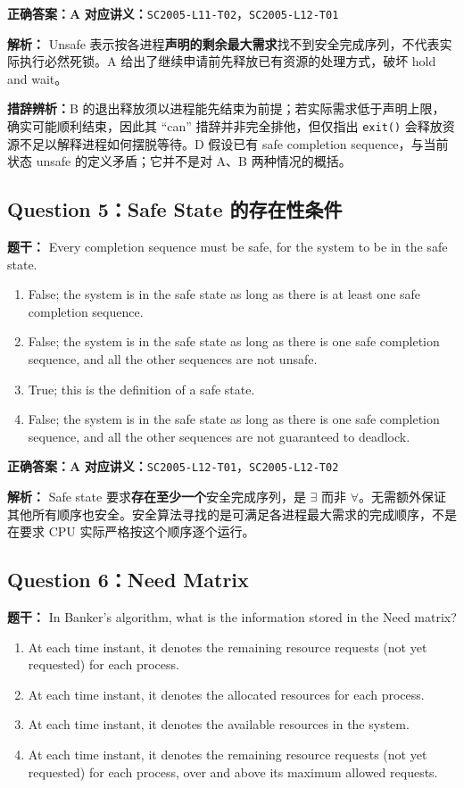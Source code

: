 \documentclass[11pt,a4paper,fontset=fandol]{ctexart}
\renewcommand{\exercisequestion}[2]{%
  \Needspace{5\baselineskip}%
  \subsection{#2}\label{exercise:#1}%
}
\renewenvironment{checkedsolution}
  {\par\nopagebreak[4]\textbf{解析：}\ignorespaces}
  {\par}
\begin{document}
\textbf{正确答案：A}\qquad
\textbf{对应讲义：}\texttt{SC2005-L11-T02}，\texttt{SC2005-L12-T01}

\begin{checkedsolution}
Unsafe 表示按各进程\textbf{声明的剩余最大需求}找不到安全完成序列，不代表实际执行必然死锁。A 给出了继续申请前先释放已有资源的处理方式，破坏 hold and wait。

\textbf{措辞辨析：}B 的退出释放须以进程能先结束为前提；若实际需求低于声明上限，确实可能顺利结束，因此其 ``can'' 措辞并非完全排他，但仅指出 \texttt{exit()} 会释放资源不足以解释进程如何摆脱等待。D 假设已有 safe completion sequence，与当前状态 unsafe 的定义矛盾；它并不是对 A、B 两种情况的概括。
\end{checkedsolution}

\exercisequestion{SC2005-HW04-Q05}{Question 5：Safe State 的存在性条件}

\textbf{题干：} Every completion sequence must be safe, for the system to be in the safe state.

\begin{enumerate}[label=\Alph*.,leftmargin=2.4em]
  \item False; the system is in the safe state as long as there is at least one safe completion sequence.
  \item False; the system is in the safe state as long as there is one safe completion sequence, and all the other sequences are not unsafe.
  \item True; this is the definition of a safe state.
  \item False; the system is in the safe state as long as there is one safe completion sequence, and all the other sequences are not guaranteed to deadlock.
\end{enumerate}

\textbf{正确答案：A}\qquad
\textbf{对应讲义：}\texttt{SC2005-L12-T01}，\texttt{SC2005-L12-T02}

\begin{checkedsolution}
Safe state 要求\textbf{存在至少一个}安全完成序列，是 $\exists$ 而非 $\forall$。无需额外保证其他所有顺序也安全。安全算法寻找的是可满足各进程最大需求的完成顺序，不是在要求 CPU 实际严格按这个顺序逐个运行。
\end{checkedsolution}

\exercisequestion{SC2005-HW04-Q06}{Question 6：Need Matrix}

\textbf{题干：} In Banker's algorithm, what is the information stored in the Need matrix?

\begin{enumerate}[label=\Alph*.,leftmargin=2.4em]
  \item At each time instant, it denotes the remaining resource requests (not yet requested) for each process.
  \item At each time instant, it denotes the allocated resources for each process.
  \item At each time instant, it denotes the available resources in the system.
  \item At each time instant, it denotes the remaining resource requests (not yet requested) for each process, over and above its maximum allowed requests.
\end{enumerate}
\end{document}
